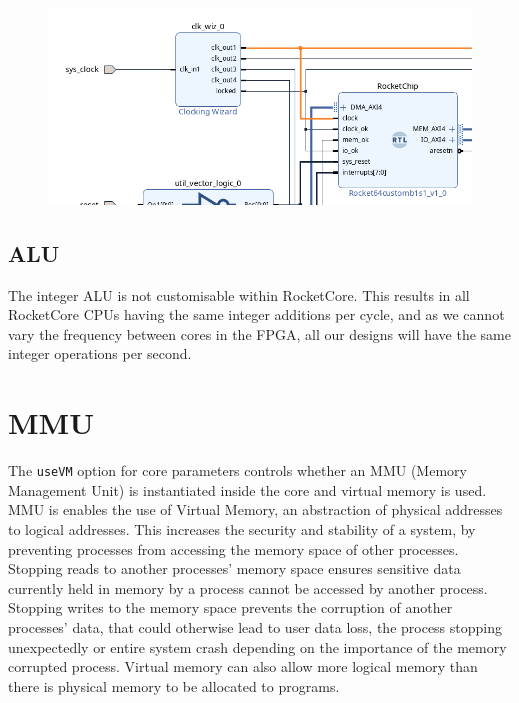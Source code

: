 \begin{figure}
    \includegraphics[]{./img/single_clock_rocketchip.png}
\end{figure}

\subsection{ALU}
The integer ALU is not customisable within RocketCore. This results in all RocketCore CPUs having the same integer additions per cycle, and as we cannot vary the frequency between cores in the FPGA, all our designs will have the same integer operations per second.

\subsection{}

\section{MMU}
The \texttt{useVM} option for core parameters controls whether an MMU (Memory Management Unit) is instantiated inside the core and virtual memory is used. MMU is enables the use of Virtual Memory, an abstraction of physical addresses to logical addresses. This increases the security and stability of a system, by preventing processes from accessing the memory space of other processes. Stopping reads to another processes' memory space ensures sensitive data currently held in memory by a process cannot be accessed by another process. Stopping writes to the memory space prevents the corruption of another processes' data, that could otherwise lead to user data loss, the process stopping unexpectedly or entire system crash depending on the importance of the memory corrupted process. Virtual memory can also allow more logical memory than there is physical memory to be allocated to programs.

